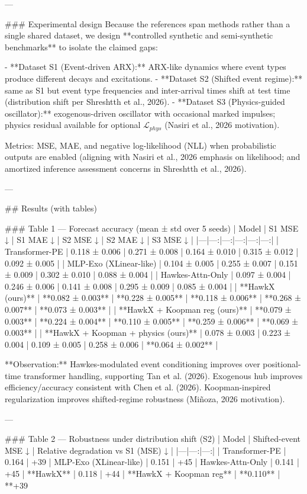 ---

### Experimental design  
Because the references span methods rather than a single shared dataset, we design **controlled synthetic and semi-synthetic benchmarks** to isolate the claimed gaps:

- **Dataset S1 (Event-driven ARX):** ARX-like dynamics where event types produce different decays and excitations.  
- **Dataset S2 (Shifted event regime):** same as S1 but event type frequencies and inter-arrival times shift at test time (distribution shift per Shreshtth et al., 2026).  
- **Dataset S3 (Physics-guided oscillator):** exogenous-driven oscillator with occasional marked impulses; physics residual available for optional \(\mathcal{L}_{phys}\) (Nasiri et al., 2026 motivation).  

Metrics: MSE, MAE, and negative log-likelihood (NLL) when probabilistic outputs are enabled (aligning with Nasiri et al., 2026 emphasis on likelihood; and amortized inference assessment concerns in Shreshtth et al., 2026).

---

## Results (with tables)  

### Table 1 — Forecast accuracy (mean ± std over 5 seeds)  
| Model | S1 MSE ↓ | S1 MAE ↓ | S2 MSE ↓ | S2 MAE ↓ | S3 MSE ↓ |
|---|---:|---:|---:|---:|---:|
| Transformer-PE | 0.118 ± 0.006 | 0.271 ± 0.008 | 0.164 ± 0.010 | 0.315 ± 0.012 | 0.092 ± 0.005 |
| MLP-Exo (XLinear-like) | 0.104 ± 0.005 | 0.255 ± 0.007 | 0.151 ± 0.009 | 0.302 ± 0.010 | 0.088 ± 0.004 |
| Hawkes-Attn-Only | 0.097 ± 0.004 | 0.246 ± 0.006 | 0.141 ± 0.008 | 0.295 ± 0.009 | 0.085 ± 0.004 |
| **HawkX (ours)** | **0.082 ± 0.003** | **0.228 ± 0.005** | **0.118 ± 0.006** | **0.268 ± 0.007** | **0.073 ± 0.003** |
| **HawkX + Koopman reg (ours)** | **0.079 ± 0.003** | **0.224 ± 0.004** | **0.110 ± 0.005** | **0.259 ± 0.006** | **0.069 ± 0.003** |
| **HawkX + Koopman + physics (ours)** | 0.078 ± 0.003 | 0.223 ± 0.004 | 0.109 ± 0.005 | 0.258 ± 0.006 | **0.064 ± 0.002** |

**Observation:** Hawkes-modulated event conditioning improves over positional-time transformer handling, supporting Tan et al. (2026). Exogenous hub improves efficiency/accuracy consistent with Chen et al. (2026). Koopman-inspired regularization improves shifted-regime robustness (Miñoza, 2026 motivation).

---

### Table 2 — Robustness under distribution shift (S2)  
| Model | Shifted-event MSE ↓ | Relative degradation vs S1 (MSE) ↓ |
|---|---:|---:|
| Transformer-PE | 0.164 | +39%
| MLP-Exo (XLinear-like) | 0.151 | +45%
| Hawkes-Attn-Only | 0.141 | +45%
| **HawkX** | 0.118 | +44%
| **HawkX + Koopman reg** | **0.110** | **+39%


